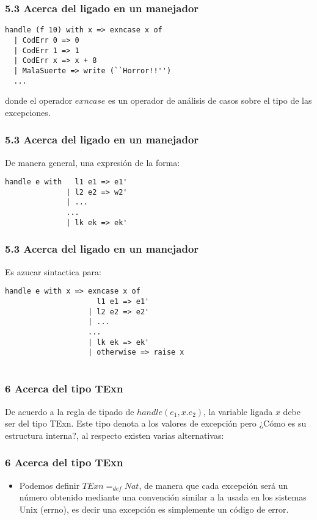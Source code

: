 \documentclass[xcolor=dvipsnames,table,spanish]{beamer}
\begin{document}
\begin{frame}[fragile]
\frametitle{5.3 Acerca del ligado en un manejador}
\begin{example}
\begin{lstlisting}
handle (f 10) with x => exncase x of
  | CodErr 0 => 0
  | CodErr 1 => 1
  | CodErr x => x + 8
  | MalaSuerte => write (``Horror!!'')
  ...
\end{lstlisting}
donde el operador $exncase$ es un operador de análisis de casos sobre el tipo de las excepciones.
\end{example}
\end{frame}
\begin{frame}[fragile]
\frametitle{5.3 Acerca del ligado en un manejador}
De manera general, una expresión de la forma:
\begin{example}
\begin{lstlisting}
handle e with   l1 e1 => e1'
              | l2 e2 => w2'
              | ...
              ...
              | lk ek => ek'
\end{lstlisting}
\end{example}

\end{frame}
\begin{frame}[fragile]
\frametitle{5.3 Acerca del ligado en un manejador}
Es azucar sintactica para:
\begin{example}
\begin{lstlisting}
handle e with x => exncase x of
                     l1 e1 => e1'
                   | l2 e2 => e2'
                   | ...
                   ...
                   | lk ek => ek'
                   | otherwise => raise x


\end{lstlisting}
\end{example}

\end{frame}
\begin{frame}
\frametitle{6 Acerca del tipo TExn}
De acuerdo a la regla de tipado de $handle(e_1,x.e_2)$, la variable ligada $x$ debe ser del tipo TExn. Este tipo denota a los valores de excepción pero ¿Cómo es su estructura interna?, al respecto existen varias alternativas:
\end{frame}

\begin{frame}
\frametitle{6 Acerca del tipo TExn}
\begin{itemize}
\item Podemos definir $TExn =_{def} Nat$, de manera que cada excepción será un número obtenido mediante una convención similar a la usada en los sistemas Unix (errno), es decir una excepción es simplemente un código de error.

\end{itemize}
\end{frame}
\end{document}
